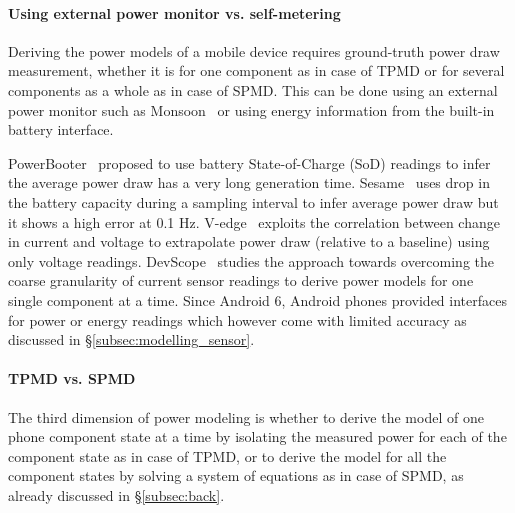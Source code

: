 \paragraph{Using external power monitor vs. self-metering}
Deriving the power models of a mobile device 
requires ground-truth power draw measurement, whether it is for one component as in case of TPMD or for several components as a whole as in case of SPMD. This can be done using an external power monitor such as Monsoon~\cite{powermonitor} or
using energy information from the built-in battery interface. 

PowerBooter~\cite{powerbooter:2010} proposed to use battery State-of-Charge (SoD) readings to infer the average power draw has a very long generation time. 
%
Sesame~\cite{sesame:2011} uses drop in the battery capacity  during a sampling interval  to infer average power draw but it shows a high error at 0.1 Hz.
% 
V-edge~\cite{vedge:2013} exploits the correlation between change in current and voltage  
to extrapolate  power draw (relative to a baseline) using only voltage readings.  
DevScope~\cite{devscope:2012} studies the approach towards overcoming the coarse granularity of current sensor readings to derive power models for one single component at a time.  
%
Since Android 6, Android phones provided interfaces for power or energy readings which however come
with limited accuracy as discussed in \S\ref{subsec:modelling_sensor}.



\paragraph{TPMD vs. SPMD}
The third dimension of power modeling is whether to derive the model of one phone component state at a time by isolating the measured power for each of the component state as in case of TPMD, or 
to derive the model for all the component states by solving a system of equations as in case of SPMD, as already discussed in \S\ref{subsec:back}.